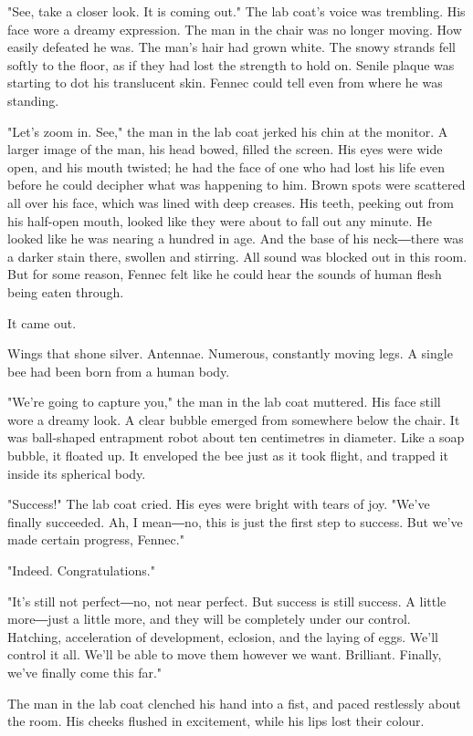 "See, take a closer look. It is coming out." The lab coat's voice was
trembling. His face wore a dreamy expression. The man in the chair was
no longer moving. How easily defeated he was. The man's hair had grown
white. The snowy strands fell softly to the floor, as if they had lost
the strength to hold on. Senile plaque was starting to dot his
translucent skin. Fennec could tell even from where he was standing.

"Let's zoom in. See," the man in the lab coat jerked his chin at the
monitor. A larger image of the man, his head bowed, filled the screen.
His eyes were wide open, and his mouth twisted; he had the face of one
who had lost his life even before he could decipher what was happening
to him. Brown spots were scattered all over his face, which was lined
with deep creases. His teeth, peeking out from his half-open mouth,
looked like they were about to fall out any minute. He looked like he
was nearing a hundred in age. And the base of his neck―there was a
darker stain there, swollen and stirring. All sound was blocked out in
this room. But for some reason, Fennec felt like he could hear the
sounds of human flesh being eaten through.

It came out.

Wings that shone silver. Antennae. Numerous, constantly moving legs. A
single bee had been born from a human body.

"We're going to capture you," the man in the lab coat muttered. His face
still wore a dreamy look. A clear bubble emerged from somewhere below
the chair. It was ball-shaped entrapment robot about ten centimetres in
diameter. Like a soap bubble, it floated up. It enveloped the bee just
as it took flight, and trapped it inside its spherical body.

"Success!" The lab coat cried. His eyes were bright with tears of joy.
"We've finally succeeded. Ah, I mean―no, this is just the first step to
success. But we've made certain progress, Fennec."

"Indeed. Congratulations."

"It's still not perfect―no, not near perfect. But success is still
success. A little more―just a little more, and they will be completely
under our control. Hatching, acceleration of development, eclosion, and
the laying of eggs. We'll control it all. We'll be able to move them
however we want. Brilliant. Finally, we've finally come this far."

The man in the lab coat clenched his hand into a fist, and paced
restlessly about the room. His cheeks flushed in excitement, while his
lips lost their colour.


